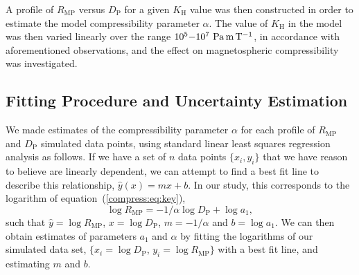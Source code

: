A profile of $R_\mathrm{MP}$ versus $D_\mathrm{P}$ for a given $K_\mathrm{H}$ value was then constructed in order to estimate the model compressibility parameter $\alpha$. The value of $K_\mathrm{H}$ in the model was then varied linearly over the range $10^5{\--}10^7~\si{\pascal\meter\per\tesla}$, in accordance with aforementioned observations, and the effect on magnetospheric compressibility was investigated. 


\subsection{Fitting Procedure and Uncertainty Estimation}
We made estimates of the compressibility parameter $\alpha$ for each profile of $R_\mathrm{MP}$ and $D_\mathrm{P}$ simulated data points, using standard linear least squares regression analysis as follows. If we have a set of $n$ data points $\{x_i,y_i\}$ that we have reason to believe are linearly dependent, we can attempt to find a best fit line to describe this relationship, $\hat{y}(x) = mx + b$. In our study, this corresponds to the logarithm of equation~(\ref{compress:eq:key}),
\begin{equation}
\log{R_\mathrm{MP}}{=}-1/{\alpha}\log {D_\mathrm{P}}+\log{a_1},
\end{equation}
such that $\hat{y} = \log{R_\mathrm{MP}}$, $x =\log{D_\mathrm{P}}$, $ m = -1/\alpha$ and $b = \log{a_1}$. We can then obtain estimates of parameters $a_1$ and $\alpha$ by fitting the logarithms of our simulated data set, $\{x_i=\log{D_\mathrm{P}}$, $y_i=\log{R_\mathrm{MP}}\}$ with a best fit line, and estimating $m$ and $b$.


